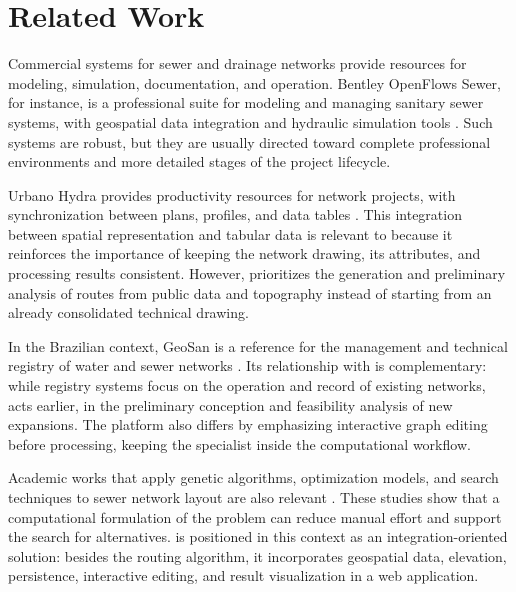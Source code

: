 \section{Related Work}\label{sec:related_work}

Commercial systems for sewer and drainage networks provide resources for modeling, simulation, documentation, and operation.
Bentley OpenFlows Sewer, for instance, is a professional suite for modeling and managing sanitary sewer systems, with geospatial data integration and hydraulic simulation tools \cite{bentley2024}.
Such systems are robust, but they are usually directed toward complete professional environments and more detailed stages of the project lifecycle.

Urbano Hydra provides productivity resources for network projects, with synchronization between plans, profiles, and data tables \cite{peterschinegg}.
This integration between spatial representation and tabular data is relevant to \method because it reinforces the importance of keeping the network drawing, its attributes, and processing results consistent.
However, \method prioritizes the generation and preliminary analysis of routes from public data and topography instead of starting from an already consolidated technical drawing.

In the Brazilian context, GeoSan is a reference for the management and technical registry of water and sewer networks \cite{nexusgeosan}.
Its relationship with \method is complementary: while registry systems focus on the operation and record of existing networks, \method acts earlier, in the preliminary conception and feasibility analysis of new expansions.
The platform also differs by emphasizing interactive graph editing before processing, keeping the specialist inside the computational workflow.

Academic works that apply genetic algorithms, optimization models, and search techniques to sewer network layout are also relevant \cite{haghighi2012,weng2014,rodrigues2020}.
These studies show that a computational formulation of the problem can reduce manual effort and support the search for alternatives.
\method is positioned in this context as an integration-oriented solution: besides the routing algorithm, it incorporates geospatial data, elevation, persistence, interactive editing, and result visualization in a web application.
